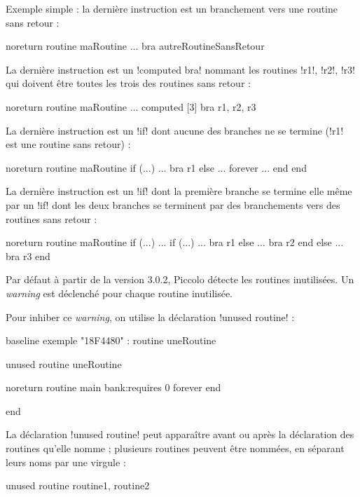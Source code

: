 Exemple simple : la dernière instruction est un branchement vers une routine sans retour :
\begin{piccolo}
noreturn routine maRoutine {
  ...
  bra autreRoutineSansRetour
}
\end{piccolo}

La dernière instruction est un \pic!computed bra! nommant les routines \pic!r1!, \pic!r2!, \pic!r3! qui doivent être toutes les trois des routines sans retour :
\begin{piccolo}
noreturn routine maRoutine {
  ...
  computed [3] bra r1, r2, r3
}
\end{piccolo}

La dernière instruction est un \pic!if! dont aucune des branches ne se termine (\pic!r1! est une routine sans retour) :
\begin{piccolo}
noreturn routine maRoutine {
  if (...)
    ...
    bra r1
  else
    ...
    forever
      ...
    end
  end
}

\end{piccolo}


La dernière instruction est un \pic!if! dont la première branche se termine elle même par un \pic!if! dont les deux branches se terminent par des branchements vers des routines sans retour :
\begin{piccolo}
noreturn routine maRoutine {
  if (...)
    ...
    if (...)
      ...
      bra r1
    else
      ...
      bra r2
    end
  else
    ...
    bra r3
  end
}
\end{piccolo}







Par défaut à partir de la version 3.0.2, Piccolo détecte les routines inutilisées. Un \emph{warning} est déclenché pour chaque routine inutilisée.

Pour inhiber ce \emph{warning}, on utilise la déclaration \pic!unused routine! :

\begin{piccolo}
baseline exemple "18F4480" :
routine uneRoutine {
}

unused routine uneRoutine
 
noreturn routine main bank:requires 0 {
  forever
  end
}

end
\end{piccolo}

La déclaration \pic!unused routine! peut apparaître avant ou après la déclaration des routines qu'elle nomme ; plusieurs routines peuvent être nommées, en séparant leurs noms par une virgule :
\begin{piccolo}
unused routine routine1, routine2
\end{piccolo}






